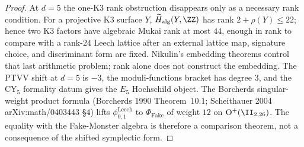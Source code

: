 \begin{proof}
At $d = 5$ the one-K3 rank obstruction disappears only as a necessary
rank condition. For a projective K3 surface $Y$,
$\widetilde H_{\mathrm{alg}}(Y,\ZZ)$ has rank $2+\rho(Y)\leq22$; hence
two K3 factors have algebraic Mukai rank at most $44$, enough in rank
to compare with a rank-$24$ Leech lattice after an external lattice map,
signature choice, and discriminant form are fixed. Nikulin's embedding
theorems control that last arithmetic problem; rank alone does not
construct the embedding. The PTVV shift at $d=5$ is $-3$, the
moduli-functions bracket has degree \(3\), and the CY$_5$ formality datum gives
the $E_5$ Hochschild object. The Borcherds singular-weight product
formula (Borcherds 1990 Theorem~$10.1$; Scheithauer 2004
arXiv:math/0403443 \S$4$) lifts $\phi_{0, 1}^{\mathrm{Leech}}$ to
$\Phi_{\mathrm{Fake}}$ of weight $12$ on $\mathrm{O}^+(\II_{2, 26})$.
The equality with the Fake-Monster algebra is therefore a comparison
theorem, not a consequence of the shifted symplectic form.
\end{proof}

